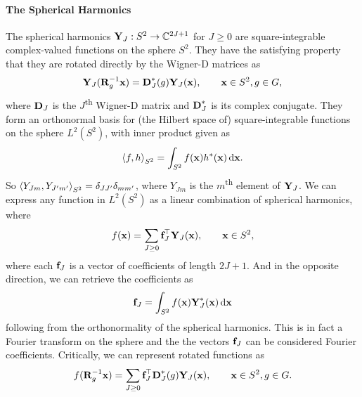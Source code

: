 \paragraph{The Spherical Harmonics}
The spherical harmonics $\textbf{Y}_J: S^2 \to \mathbb{C}^{2J+1}$ for $J \geq 0$ are square-integrable complex-valued functions on the sphere $S^2$. They have the satisfying property that they are rotated directly by the Wigner-D matrices as
\begin{align}
    \textbf{Y}_J(\textbf{R}_g^{-1}\textbf{x}) = \textbf{D}_{J}^*(g)\textbf{Y}_{J}(\textbf{x}), \qquad \textbf{x} \in S^2, g\in G, \label{eq:spherical-harmonics}
\end{align}
where $\textbf{D}_J$ is the $J$\textsuperscript{th} Wigner-D matrix and $\textbf{D}_J^*$ is its complex conjugate. They form an orthonormal basis for (the Hilbert space of) square-integrable functions on the sphere $L^2(S^2)$, with inner product given as
\begin{align}
    \left\langle f, h \right\rangle_{S^2} = \int_{S^2} f(\textbf{x}) h^*(\textbf{x}) \, \mathrm d\textbf{x}.
\end{align}
So $\left\langle Y_{Jm}, Y_{J'm'} \right\rangle_{S^2} = \delta_{JJ'} \delta_{mm'}$, where $Y_{Jm}$ is the $m$\textsuperscript{th} element of $\textbf{Y}_J$. We can express any function in $L^2(S^2)$ as a linear combination of spherical harmonics, where
\begin{align}
    f(\textbf{x}) = \sum_{J \geq 0} \textbf{f}_J^\top \textbf{Y}_{J}(\textbf{x}), \qquad \textbf{x} \in S^2,
\end{align}
where each $\textbf{f}_J$ is a vector of coefficients of length $2J+1$. And in the opposite direction, we can retrieve the coefficients as
\begin{align}
    \textbf{f}_J = \int_{S^2} f(\textbf{x}) \textbf{Y}_{J}^* (\textbf{x}) \, \mathrm{d} \textbf{x}
\end{align}
following from the orthonormality of the spherical harmonics.
This is in fact a Fourier transform on the sphere and the the vectors $\textbf{f}_J$ can be considered Fourier coefficients. Critically, we can represent rotated functions as
\begin{align}
    f(\textbf{R}_g^{-1}\textbf{x}) = \sum_{J \geq 0} \textbf{f}_J^\top \textbf{D}_{J}^*(g)\textbf{Y}_{J}(\textbf{x}), \qquad \textbf{x} \in S^2, g\in G.
\end{align}

